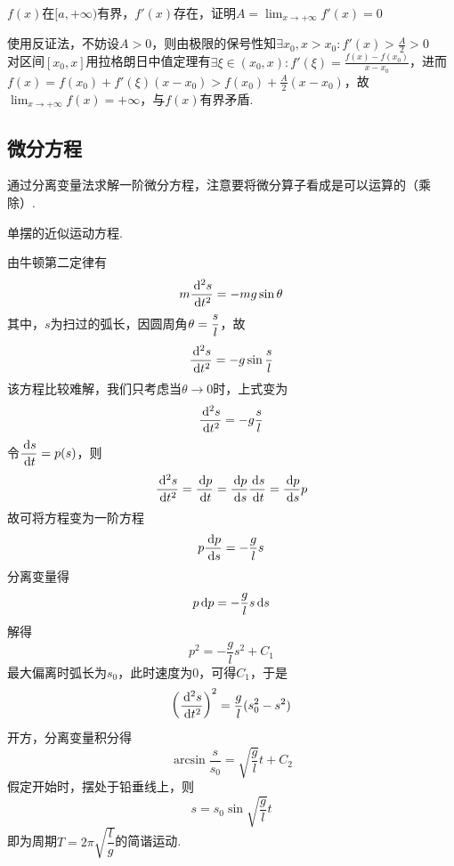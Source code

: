 \begin{example}
$f(x)$在$[a,+\infty)$有界，$f'(x)$存在，证明$A=\displaystyle\lim_{x\to+\infty}f'(x)=0$
\end{example}
\begin{analysis}
使用反证法，不妨设$A>0$，则由极限的保号性知$\displaystyle\exists x_0,x>x_0:f'(x)>\frac{A}{2}>0$\\
对区间$[x_0,x]$用拉格朗日中值定理有$\exists\xi\in(x_0,x):\displaystyle f'(\xi)=\frac{f(x)-f(x_0)}{x-x_0}$，进而$\displaystyle f(x)=f(x_0)+f'(\xi)(x-x_0)>f(x_0)+\frac{A}{2}(x-x_0)$，故$\displaystyle\lim_{x\to+\infty}f(x)=+\infty$，与$f(x)$有界矛盾.
\end{analysis}


\subsection{微分方程}
通过分离变量法求解一阶微分方程，注意要将微分算子看成是可以运算的（乘除）.
\begin{example}
单摆的近似运动方程.
\end{example}
\begin{analysis}
由牛顿第二定律有
\[m\dfrac{\,\mathrm{d}^2 s}{\,\mathrm{d} t^2}=-mg\sin\theta\]
其中，$s$为扫过的弧长，因圆周角$\displaystyle\theta=\dfrac{s}{l}$，故
\[\dfrac{\,\mathrm{d}^2 s}{\,\mathrm{d} t^2}=-g\sin\dfrac{s}{l}\]
该方程比较难解，我们只考虑当$\theta\to 0$时，上式变为
\[\dfrac{\,\mathrm{d}^2 s}{\,\mathrm{d} t^2}=-g\dfrac{s}{l}\]
令$\dfrac{\,\mathrm{d} s}{\,\mathrm{d} t}=p(s)$，则
\[\dfrac{\,\mathrm{d}^2 s}{\,\mathrm{d} t^2}=\dfrac{\,\mathrm{d} p}{\,\mathrm{d} t}=\dfrac{\,\mathrm{d} p}{\,\mathrm{d} s}\dfrac{\,\mathrm{d} s}{\,\mathrm{d} t}=\dfrac{\,\mathrm{d} p}{\,\mathrm{d} s}p\]
故可将方程变为一阶方程
\[p\dfrac{\,\mathrm{d} p}{\,\mathrm{d} s}=-\dfrac{g}{l}s\]
分离变量得
\[p\,\mathrm{d} p=-\dfrac{g}{l}s\,\mathrm{d} s\]
解得
\[p^2=-\dfrac{g}{l}s^2+C_1\]
最大偏离时弧长为$s_0$，此时速度为$0$，可得$C_1$，于是
\[\left(\dfrac{\,\mathrm{d}^2 s}{\,\mathrm{d} t^2}\right)^2=\dfrac{g}{l}(s_0^2-s^2)\]
开方，分离变量积分得
\[\arcsin\dfrac{s}{s_0}=\sqrt{\dfrac{g}{l}}t+C_2\]
假定开始时，摆处于铅垂线上，则
\[s=s_0\sin\sqrt{\dfrac{g}{l}}t\]
即为周期$T=2\pi\sqrt{\dfrac{l}{g}}$的简谐运动.
\end{analysis}